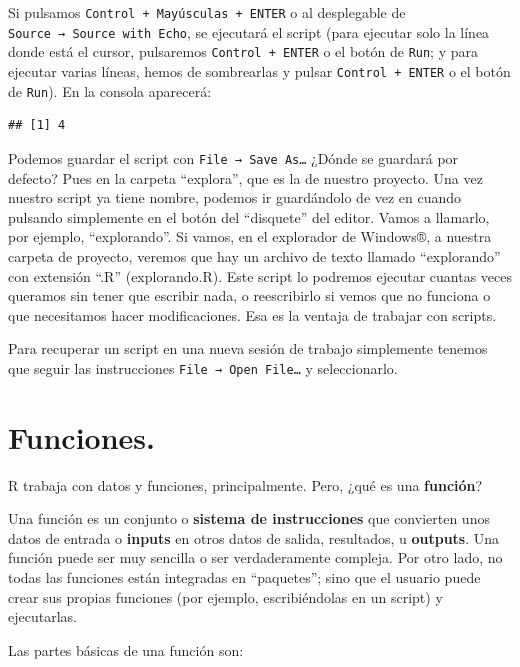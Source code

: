 \documentclass[
]{book}
\begin{document}
Si pulsamos \texttt{Control\ +\ Mayúsculas\ +\ ENTER} o al desplegable de \texttt{Source\ →\ Source\ with\ Echo}, se ejecutará el script (para ejecutar solo la línea donde está el cursor, pulsaremos \texttt{Control\ +\ ENTER} o el botón de \texttt{Run}; y para ejecutar varias líneas, hemos de sombrearlas y pulsar \texttt{Control\ +\ ENTER} o el botón de \texttt{Run}). En la consola aparecerá:

\begin{verbatim}
## [1] 4
\end{verbatim}

Podemos guardar el script con \texttt{File\ →\ Save\ As…} ¿Dónde se guardará por defecto? Pues en la carpeta ``explora'', que es la de nuestro proyecto. Una vez nuestro script ya tiene nombre, podemos ir guardándolo de vez en cuando pulsando simplemente en el botón del ``disquete'' del editor. Vamos a llamarlo, por ejemplo, ``explorando''. Si vamos, en el explorador de Windows®, a nuestra carpeta de proyecto, veremos que hay un archivo de texto llamado ``explorando'' con extensión ``.R'' (explorando.R). Este script lo podremos ejecutar cuantas veces queramos sin tener que escribir nada, o reescribirlo si vemos que no funciona o que necesitamos hacer modificaciones. Esa es la ventaja de trabajar con scripts.

Para recuperar un script en una nueva sesión de trabajo simplemente tenemos que seguir las instrucciones \texttt{File\ →\ Open\ File…} y seleccionarlo.

\section{Funciones.}\label{funciones.}

R trabaja con datos y funciones, principalmente. Pero, ¿qué es una \textbf{función}?

Una función es un conjunto o \textbf{sistema de instrucciones} que convierten unos datos de entrada o \textbf{inputs} en otros datos de salida, resultados, u \textbf{outputs}. Una función puede ser muy sencilla o ser verdaderamente compleja. Por otro lado, no todas las funciones están integradas en ``paquetes''; sino que el usuario puede crear sus propias funciones (por ejemplo, escribiéndolas en un script) y ejecutarlas.

Las partes básicas de una función son:
\end{document}
